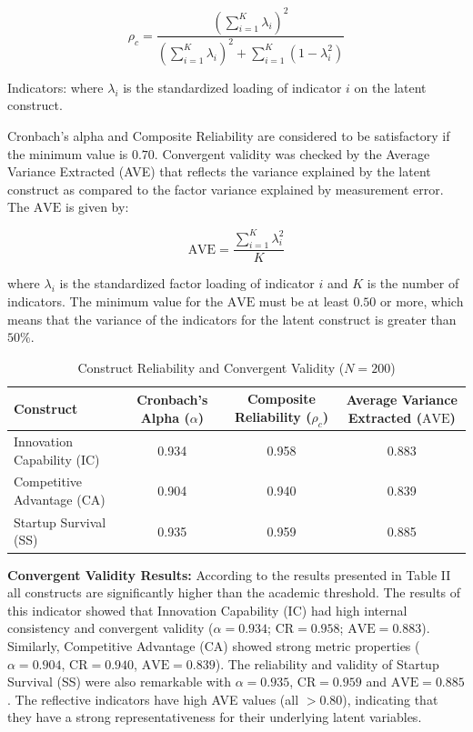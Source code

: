 \documentclass{ieeeaccess}
\begin{document}
\begin{equation}
\rho_c =
\frac{
\left(\sum_{i=1}^{K}\lambda_i\right)^2
}{
\left(\sum_{i=1}^{K}\lambda_i\right)^2
+
\sum_{i=1}^{K}
\left(1-\lambda_i^2\right)
}
\end{equation}

Indicators: where $\lambda_i$ is the standardized loading of indicator $i$ on the latent construct.

Cronbach's alpha and Composite Reliability are considered to be satisfactory if the minimum value is $0.70$. Convergent validity was checked by the Average Variance Extracted (AVE) that reflects the variance explained by the latent construct as compared to the factor variance explained by measurement error. The $\text{AVE}$ is given by:

\begin{equation}
\text{AVE}
=
\frac{
\sum_{i=1}^{K}\lambda_i^2
}{K}
\end{equation}

where $\lambda_i$ is the standardized factor loading of indicator $i$ and $K$ is the number of indicators. The minimum value for the $\text{AVE}$ must be at least $0.50$ or more, which means that the variance of the indicators for the latent construct is greater than $50\%$.

\begin{table}[htbp]
\caption{Construct Reliability and Convergent Validity ($N = 200$)}
\label{tab:reliability_validity}
\centering
\begin{tabular}{lccc}
\hline
\textbf{Construct} &
\textbf{Cronbach's Alpha ($\alpha$)} &
\textbf{Composite Reliability ($\rho_c$)} &
\textbf{Average Variance Extracted ($\text{AVE}$)} \\
\hline

Innovation Capability (IC)
& 0.934
& 0.958
& 0.883 \\

Competitive Advantage (CA)
& 0.904
& 0.940
& 0.839 \\

Startup Survival (SS)
& 0.935
& 0.959
& 0.885 \\
\hline
\end{tabular}
\end{table}

\textbf{Convergent Validity Results:}
According to the results presented in Table II all constructs are significantly higher than the academic threshold. The results of this indicator showed that Innovation Capability (IC) had high internal consistency and convergent validity ($\alpha = 0.934$; $\text{CR} = 0.958$; $\text{AVE} = 0.883$). Similarly, Competitive Advantage (CA) showed strong metric properties ($\alpha = 0.904$, $\text{CR} = 0.940$, $\text{AVE} = 0.839$). The reliability and validity of Startup Survival (SS) were also remarkable with $\alpha = 0.935$, $\text{CR} = 0.959$ and $\text{AVE} = 0.885$. The reflective indicators have high AVE values (all $> 0.80$), indicating that they have a strong representativeness for their underlying latent variables.
\end{document}
